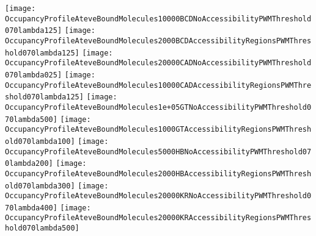 \documentclass[11pt]{article}
\begin{document}
 

\clearpage

\begin{center}
\texttt{[image: OccupancyProfileAteveBoundMolecules10000BCDNoAccessibilityPWMThreshold070lambda125]}
\texttt{[image: OccupancyProfileAteveBoundMolecules2000BCDAccessibilityRegionsPWMThreshold070lambda125]}
\texttt{[image: OccupancyProfileAteveBoundMolecules20000CADNoAccessibilityPWMThreshold070lambda025]}
\texttt{[image: OccupancyProfileAteveBoundMolecules10000CADAccessibilityRegionsPWMThreshold070lambda125]}
\texttt{[image: OccupancyProfileAteveBoundMolecules1e+05GTNoAccessibilityPWMThreshold070lambda500]}
\texttt{[image: OccupancyProfileAteveBoundMolecules1000GTAccessibilityRegionsPWMThreshold070lambda100]}
\texttt{[image: OccupancyProfileAteveBoundMolecules5000HBNoAccessibilityPWMThreshold070lambda200]}
\texttt{[image: OccupancyProfileAteveBoundMolecules2000HBAccessibilityRegionsPWMThreshold070lambda300]}
\texttt{[image: OccupancyProfileAteveBoundMolecules20000KRNoAccessibilityPWMThreshold070lambda400]}
\texttt{[image: OccupancyProfileAteveBoundMolecules20000KRAccessibilityRegionsPWMThreshold070lambda500]}
\end{center}
\end{document}
